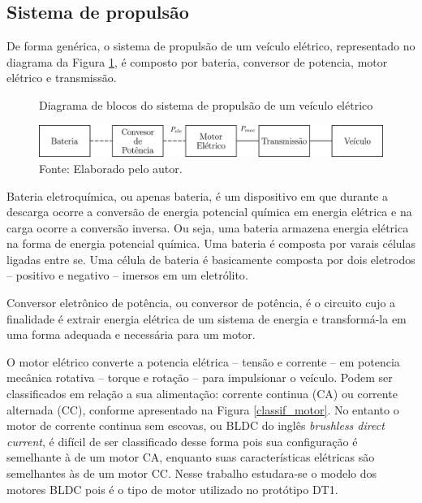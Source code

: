 \subsection{Sistema de propulsão}
\label{subsec:sistema_propulsao}

De forma genérica, o sistema de propulsão de um veículo elétrico, representado no diagrama da Figura \ref{fig:diagrama_propulsao}, é composto por
bateria, conversor de potencia, motor elétrico e transmissão.

\begin{figure}[h]
	\centering
	\caption{Diagrama de blocos do sistema de propulsão de um veículo elétrico}
	\label{fig:diagrama_propulsao}
	\includegraphics{DescricaoProcesso/Figuras/g874.png}
	\caption*{\footnotesize Fonte: Elaborado pelo autor.}
\end{figure}



Bateria eletroquímica, ou apenas bateria, é um dispositivo em que durante a descarga ocorre a conversão de energia potencial química em energia
elétrica e na carga ocorre a conversão inversa. Ou seja, uma bateria armazena energia elétrica na forma de energia potencial química. Uma bateria é
composta por varais células ligadas entre se. Uma célula de bateria é basicamente composta por dois eletrodos -- positivo e
negativo -- imersos em um eletrólito\cite{book:Modern_Electric_Vehicles}.



Conversor eletrônico de potência, ou conversor de potência, é o circuito cujo a finalidade é extrair energia elétrica de um sistema de energia e
transformá-la em uma forma adequada e necessária para um motor\cite{book:Electric_Motor_Control}.


O motor elétrico converte a potencia elétrica -- tensão e corrente -- em potencia mecânica rotativa -- torque e rotação -- para impulsionar o
veículo.\cite{book:Modern_Electric_Vehicles} Podem ser classificados em relação a sua alimentação: corrente continua
(CA) ou corrente alternada (CC), conforme apresentado na Figura \ref{classif_motor}.
No entanto o motor de corrente continua sem escovas, ou BLDC do inglês \textit{brushless direct current}, é difícil de ser classificado desse forma
pois sua configuração é semelhante à de um motor CA, enquanto suas características elétricas são semelhantes às de um motor
CC.\cite{book:Electric_Motor_Control} Nesse trabalho estudara-se o modelo dos motores BLDC pois é o tipo de motor utilizado no protótipo DT1.

